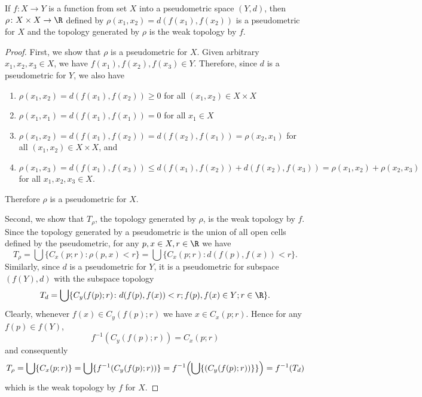 \setcounter{question}{30} %
\begin{question}[Ewing]
If $f\colon X\to Y$ is a function from set $X$ into a pseudometric space $(Y,d)$, then $\rho\colon X\times X\to \R$ defined by $\rho(x_1,x_2)=d(f(x_1),f(x_2))$ is a pseudometric for $X$ and the topology generated by $\rho$ is the weak topology by $f$.
\end{question}

\begin{proof}
First, we show that $\rho$ is a pseudometric for $X$. Given arbitrary $x_1,x_2,x_3\in X$, we have $f(x_1), f(x_2), f(x_3)\in Y$. Therefore, since $d$ is a pseudometric for $Y$, we also have
\begin{enumerate}
\item $\rho(x_1,x_2)=d(f(x_1),f(x_2))\ge 0$ for all $(x_1,x_2)\in X\times X$
\item $\rho(x_1,x_1)=d(f(x_1),f(x_1))=0$ for all $x_1\in X$
\item $\rho(x_1,x_2)=d(f(x_1),f(x_2))=d(f(x_2),f(x_1))=\rho(x_2,x_1)$ for all $(x_1,x_2)\in X\times X$, and
\item $\rho(x_1,x_3)=d(f(x_1),f(x_3))\le d(f(x_1),f(x_2))+d(f(x_2),f(x_3))=\rho(x_1,x_2)+\rho(x_2,x_3)$ for all $x_1,x_2,x_3\in X$.
\end{enumerate}
Therefore $\rho$ is a pseudometric for $X$.

Second, we show that $T_{\rho}$, the topology generated by $\rho$, is the weak topology by $f$. Since the topology generated by a pseudometric is the union of all open cells defined by the pseudometric, for any $p,x\in X, r\in\R$ we have $$T_{\rho}=\bigcup\{C_x(p;r)\colon \rho(p,x)<r\}=\bigcup\{C_x(p;r)\colon d(f(p),f(x))<r\}.$$ Similarly, since $d$ is a pseudometric for $Y$, it is a pseudometric for subspace $(f(Y),d)$ with the subspace topology $$T_d=\bigcup\{C_y(f(p);r)\colon d(f(p),f(x))<r; f(p),f(x)\in Y; r\in\R\}.$$ Clearly, whenever $f(x)\in C_y(f(p);r)$ we have $x\in C_x(p;r)$. Hence for any $f(p)\in f(Y)$, $$f^{-1}(C_y(f(p);r))=C_x(p;r)$$ and consequently $$T_{\rho}=\bigcup\{C_x(p;r)\}=\bigcup\{f^{-1}(C_y(f(p);r))\}=f^{-1}\Bigl(\bigcup\{(C_y(f(p);r))\}\}\Bigr)=f^{-1}(T_{d})$$ which is the weak topology by $f$ for $X$.
\end{proof}

